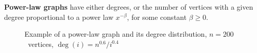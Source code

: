 \documentclass{beamer}
\newcommand{\autotitle}{\secname\ifdefempty{\subsecname}{}{~--- \subsecname}}
\begin{document}
\begin{frame}{\autotitle}
    \textbf{Power-law graphs} have either degrees,
    or the number of vertices with a given degree
    proportional to a power law $x^{-\beta}$, for some constant $\beta\geq0$.
    \begin{figure}
        \centering
        \qquad
        \caption{Example of a power-law graph and its degree distribution,
            $n=200$~vertices, $\deg(i)=n^{0.6}/i^{0.4}$}
    \end{figure}
\end{frame}
\end{document}
